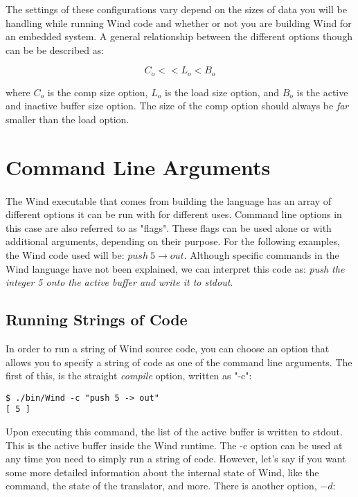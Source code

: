 \par The settings of these configurations vary depend on the sizes of data you will be handling while running Wind code and whether or not you are building Wind for an embedded system. A general relationship between the different options though can be be described as:

$$
C_o << L_o < B_o
$$

where $C_o$ is the comp size option, $L_o$ is the load size option, and $B_o$ is the active and inactive buffer size option. The size of the comp option should always be \emph{far} smaller than the load option.

\section{Command Line Arguments}

\paragraph{  } The Wind executable that comes from building the language has an array of different options it can be run with for different uses. Command line options in this case are also referred to as "flags". These flags can be used alone or with additional arguments, depending on their purpose. For the following examples, the Wind code used will be: $push\: 5 \longrightarrow out$. Although specific commands in the Wind language have not been explained, we can interpret this code as: \emph{push the integer 5 onto the active buffer and write it to stdout}.

\subsection{Running Strings of Code}

\par In order to run a string of Wind source code, you can choose an option that allows you to specify a string of code as one of the command line arguments. The first of this, is the straight \emph{compile} option, written as "-c":

\begin{verbatim}
$ ./bin/Wind -c "push 5 -> out"
[ 5 ]
\end{verbatim}

Upon executing this command, the list of the active buffer is written to stdout. This is the active buffer inside the Wind runtime. The -c option can be used at any time you need to simply run a string of code. However, let's say if you want some more detailed information about the internal state of Wind, like the command, the state of the translator, and more. There is another option, $-d$:

